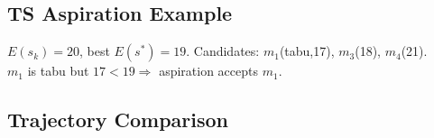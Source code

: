 \subsection*{TS Aspiration Example}
\(E(s_k){=}20\), best \(E(s^*){=}19\). Candidates: \(m_1\)(tabu,17), \(m_3\)(18), \(m_4\)(21).\\
\(m_1\) is tabu but \(17<19\Rightarrow\) aspiration accepts \(m_1\).

\subsection*{Trajectory Comparison}
